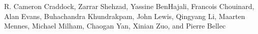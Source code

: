 R. Cameron Craddock, Zarrar Shehzad, Yassine BenHajali, Francois Chouinard, Alan Evans, Buhachandra Khundrakpam, John Lewis, Qingyang Li, Maarten Mennes, Michael Milham, Chaogan Yan, Xinian Zuo, and Pierre Bellec